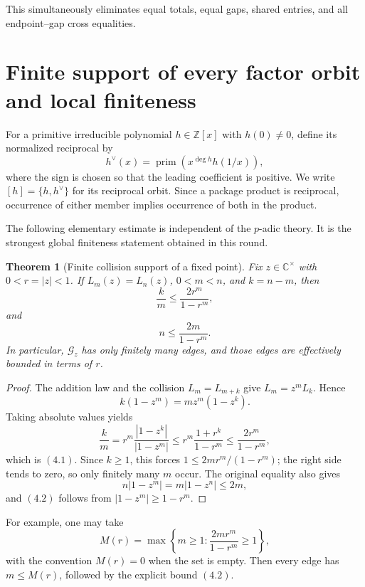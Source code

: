 \documentclass[11pt]{article}
\newtheorem{theorem}{Theorem}[section]
\theoremstyle{definition}
\newcommand{\Z}{\mathbb Z}
\newcommand{\C}{\mathbb C}
\begin{document}
This simultaneously eliminates equal totals, equal gaps, shared entries, and
all endpoint--gap cross equalities.

\section{Finite support of every factor orbit and local finiteness}
\label{sec:finite-support}

For a primitive irreducible polynomial \(h\in\Z[x]\) with \(h(0)\neq0\),
define its normalized reciprocal by
\[
 h^\vee(x)=\operatorname{prim}\!\left(x^{\deg h}h(1/x)\right),
\]
where the sign is chosen so that the leading coefficient is positive.  We
write \([h]=\{h,h^\vee\}\) for its reciprocal orbit.  Since a package
product is reciprocal, occurrence of either member implies occurrence of both
in the product.

The following elementary estimate is independent of the \(p\)-adic theory.
It is the strongest global finiteness statement obtained in this round.

\begin{theorem}[Finite collision support of a fixed point]
\label{thm:pointfinite}
Fix \(z\in\C^\times\) with \(0<r=|z|<1\).  If
\(L_m(z)=L_n(z)\), \(0<m<n\), and \(k=n-m\), then
\begin{equation}
 \frac{k}{m}
 \leq \frac{2r^m}{1-r^m},
 \tag{4.1}
\end{equation}
and
\begin{equation}
 n\leq\frac{2m}{1-r^m}.
 \tag{4.2}
\end{equation}
In particular, \(\mathcal G_z\) has only finitely many edges, and those edges
are effectively bounded in terms of \(r\).
\end{theorem}

\begin{proof}
The addition law and the collision \(L_m=L_{m+k}\) give
\(L_m=z^mL_k\).  Hence
\[
 k(1-z^m)=mz^m(1-z^k).
\]
Taking absolute values yields
\[
 \frac{k}{m}
 =r^m\frac{|1-z^k|}{|1-z^m|}
 \leq r^m\frac{1+r^k}{1-r^m}
 \leq\frac{2r^m}{1-r^m},
\]
which is \((4.1)\).  Since \(k\geq1\), this forces
\(1\leq2mr^m/(1-r^m)\); the right side tends to zero, so only finitely
many \(m\) occur.  The original equality also gives
\[
 n|1-z^m|=m|1-z^n|\leq2m,
\]
and \((4.2)\) follows from \(|1-z^m|\geq1-r^m\).
\end{proof}

For example, one may take
\[
 M(r)=\max\left\{m\geq1:\frac{2mr^m}{1-r^m}\geq1\right\},
\]
with the convention \(M(r)=0\) when the set is empty.  Then every edge has
\(m\leq M(r)\), followed by the explicit bound \((4.2)\).
\end{document}
